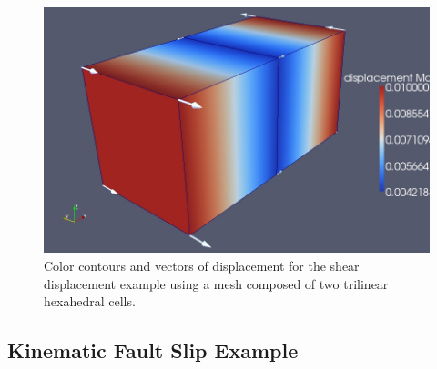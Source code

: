 \begin{figure}
  \includegraphics[scale=0.33]{examples/figs/twohex8-sheardisp}
  \caption{Color contours and vectors of displacement for the shear displacement
    example using a mesh composed of two trilinear hexahedral cells.}
  \label{fig:twohex8-shear}
\end{figure}


\subsection{Kinematic Fault Slip Example}

